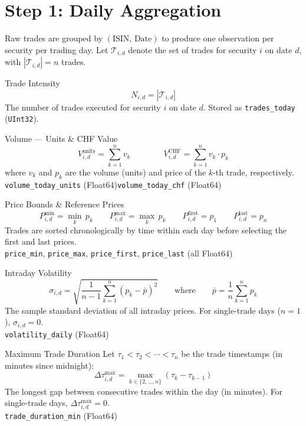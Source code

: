 \documentclass[
  11pt,
  a4paper,
  twoside,
  openany
]{report}
\begin{document}
\section{Step 1: Daily Aggregation}

Raw trades are grouped by $(\text{ISIN},\, \text{Date})$ to produce one observation per security per trading day.  Let $\mathcal{T}_{i,d}$ denote the set of trades for security $i$ on date $d$, with $|\mathcal{T}_{i,d}| = n$ trades.

\begin{formulabox}{Trade Intensity}
\[
  N_{i,d} = |\mathcal{T}_{i,d}|
\]
The number of trades executed for security $i$ on date $d$.  Stored as \texttt{trades\_today} (\texttt{UInt32}).
\end{formulabox}

\begin{formulabox}{Volume — Units \& CHF Value}
\[
  V_{i,d}^{\text{units}} = \sum_{k=1}^{n} v_k
  \qquad\qquad
  V_{i,d}^{\text{CHF}} = \sum_{k=1}^{n} v_k \cdot p_k
\]
where $v_k$ and $p_k$ are the volume (units) and price of the $k$-th trade, respectively.\\[4pt]
\texttt{volume\_today\_units} (Float64)\;\;\textbar\;\;\texttt{volume\_today\_chf} (Float64)
\end{formulabox}

\begin{formulabox}{Price Bounds \& Reference Prices}
\[
  P_{i,d}^{\min} = \min_{k} \, p_k
  \qquad
  P_{i,d}^{\max} = \max_{k} \, p_k
  \qquad
  P_{i,d}^{\text{first}} = p_1
  \qquad
  P_{i,d}^{\text{last}} = p_n
\]
Trades are sorted chronologically by time within each day before selecting the first and last prices.\\[4pt]
\texttt{price\_min}, \texttt{price\_max}, \texttt{price\_first}, \texttt{price\_last} (all Float64)
\end{formulabox}

\begin{formulabox}{Intraday Volatility}
\[
  \sigma_{i,d} = \sqrt{\frac{1}{n-1} \sum_{k=1}^{n} \left(p_k - \bar{p}\right)^2}
  \qquad\text{where}\qquad
  \bar{p} = \frac{1}{n}\sum_{k=1}^{n} p_k
\]
The sample standard deviation of all intraday prices.  For single-trade days ($n=1$), $\sigma_{i,d} = 0$.\\[4pt]
\texttt{volatility\_daily} (Float64)
\end{formulabox}

\begin{formulabox}{Maximum Trade Duration}
Let $\tau_1 < \tau_2 < \cdots < \tau_n$ be the trade timestamps (in minutes since midnight):
\[
  \Delta\tau_{i,d}^{\max} = \max_{k \in \{2,\ldots,n\}} \left(\tau_k - \tau_{k-1}\right)
\]
The longest gap between consecutive trades within the day (in minutes).  For single-trade days, $\Delta\tau_{i,d}^{\max} = 0$.\\[4pt]
\texttt{trade\_duration\_min} (Float64)
\end{formulabox}
\end{document}
